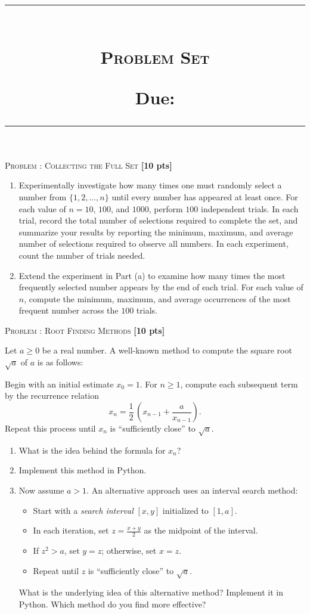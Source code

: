 \documentclass[a4paper,11pt]{article}
\title{
\hrule
\vspace{-0.5em}
\begin{multicols}{2}
\raggedright \large \textbf{\course}\\ %
\large \textsc{Problem Set \pset} \\
\vspace{0.25em}

\raggedleft \small \textbf{Due:} \due \\
\end{multicols}
\vspace{-0.3em}
\hrule}
\date{}
\author{}
\newenvironment{tcomment}[1][]{
	\begin{mdframed}[
		linecolor=black,
		linewidth=0.5pt,
		innerleftmargin=5pt,
		innerrightmargin=5pt,
		innertopmargin=5pt,
		innerbottommargin=5pt
		]
		\small\color[RGB]{70,70,70}
		\textbf{Notes:}\par\vspace{5cm}
		}{\end{mdframed}}
\newcounter{pnr}
\newenvironment{problem}[2][]{
\noindent\textsc{Problem \arabic{pnr}: #2} \hfill \textbf{[#1 pts]}\par
	\stepcounter{pnr}
	}{
	}{\vspace{0.3cm}}
\begin{document}
\maketitle
\vspace{-1cm}
\begin{problem}[10]{Collecting the Full Set}
	\begin{enumerate}
		\item Experimentally investigate how many times one must randomly select a number from $\{1, 2, \ldots, n\}$ until every number has appeared at least once. For each value of $n= 10$, $100$, and $1000$, perform $100$ independent trials. In each trial, record the total number of selections required to complete the set, and summarize your results by reporting the minimum, maximum, and average number of selections required to observe all numbers. In each experiment, count the number of trials needed.
		
		\item Extend the experiment in Part (a) to examine how many times the most frequently selected number appears by the end of each trial. For each value of $n$, compute the minimum, maximum, and average occurrences of the most frequent number across the $100$ trials.
	\end{enumerate}
\end{problem}

\begin{problem}[10]{Root Finding Methods}
	Let $a \geq 0$ be a real number. A well-known method to compute the square root $\sqrt{a}$ of $a$ is as follows:
	
	Begin with an initial estimate $x_0 = 1$. For $n \geq 1$, compute each subsequent term by the recurrence relation 
	\[
	x_n = \frac{1}{2}\,\left(x_{n - 1} + \frac{a}{x_{n - 1}}\right).
	\]
	Repeat this process until $x_n$ is ``sufficiently close'' to $\sqrt{a}$.
	
	\begin{enumerate}
		\item What is the idea behind the formula for $x_n$?
		
		\item Implement this method in Python.
		
		\item Now assume $a > 1$. An alternative approach uses an interval search method:
		\begin{itemize}
			\item Start with a \emph{search interval} $[x,y]$ initialized to $[1, a]$.
			\item In each iteration, set $z = \frac{x + y}{2}$ as the midpoint of the interval.
			\item If $z^2 > a$, set $y = z$; otherwise, set $x = z$.
			\item Repeat until $z$ is ``sufficiently close'' to $\sqrt{a}$.
		\end{itemize}
		What is the underlying idea of this alternative method? Implement it in Python. Which method do you find more effective?
	\end{enumerate}
\end{problem}
\end{document}
